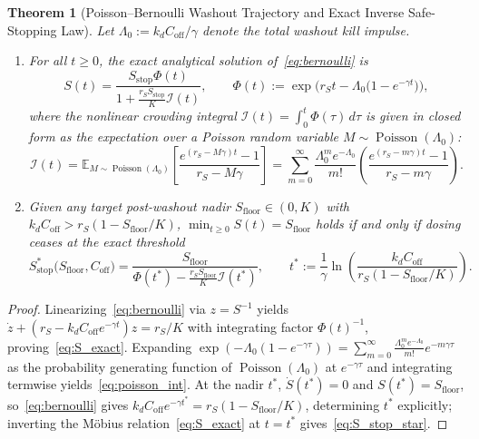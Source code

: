 \documentclass[11pt,reqno]{article}
\newtheorem{theorem}{Theorem}[section]
\begin{document}
\begin{theorem}[Poisson--Bernoulli Washout Trajectory and Exact Inverse Safe-Stopping Law]\label{thm:washout}
Let $\Lambda_0 := k_d C_{\mathrm{off}}/\gamma$ denote the total washout kill impulse.
\begin{enumerate}
    \item For all $t \ge 0$, the exact analytical solution of~\eqref{eq:bernoulli} is
    \begin{equation}\label{eq:S_exact}
    S(t) = \frac{S_{\mathrm{stop}}\Phi(t)}{1 + \frac{r_S S_{\mathrm{stop}}}{K}\mathcal{I}(t)}, \qquad \Phi(t) := \exp\Big(r_S t - \Lambda_0\big(1-e^{-\gamma t}\big)\Big),
    \end{equation}
    where the nonlinear crowding integral $\mathcal{I}(t) = \int_0^t \Phi(\tau)\,d\tau$ is given in closed form as the expectation over a Poisson random variable $M \sim \operatorname{Poisson}(\Lambda_0)$:
    \begin{equation}\label{eq:poisson_int}
    \mathcal{I}(t) = \mathbb{E}_{M\sim\operatorname{Poisson}(\Lambda_0)}\!\left[\frac{e^{(r_S - M\gamma)t}-1}{r_S - M\gamma}\right] = \sum_{m=0}^{\infty} \frac{\Lambda_0^m e^{-\Lambda_0}}{m!}\left(\frac{e^{(r_S - m\gamma)t}-1}{r_S - m\gamma}\right).
    \end{equation}
    \item Given any target post-washout nadir $S_{\mathrm{floor}} \in (0, K)$ with $k_d C_{\mathrm{off}} > r_S(1 - S_{\mathrm{floor}}/K)$, $\min_{t\ge 0} S(t) = S_{\mathrm{floor}}$ holds if and only if dosing ceases at the exact threshold
    \begin{equation}\label{eq:S_stop_star}
    S_{\mathrm{stop}}^*\big(S_{\mathrm{floor}}, C_{\mathrm{off}}\big) = \frac{S_{\mathrm{floor}}}{\Phi(t^*) - \frac{r_S S_{\mathrm{floor}}}{K}\mathcal{I}(t^*)}, \qquad t^* := \frac{1}{\gamma}\ln\!\left(\frac{k_d C_{\mathrm{off}}}{r_S(1 - S_{\mathrm{floor}}/K)}\right).
    \end{equation}
\end{enumerate}
\end{theorem}
\begin{proof}
Linearizing~\eqref{eq:bernoulli} via $z = S^{-1}$ yields $\dot{z} + (r_S - k_d C_{\mathrm{off}}e^{-\gamma t})z = r_S/K$ with integrating factor $\Phi(t)^{-1}$, proving~\eqref{eq:S_exact}. Expanding $\exp(-\Lambda_0(1-e^{-\gamma\tau})) = \sum_{m=0}^\infty \frac{\Lambda_0^m e^{-\Lambda_0}}{m!}e^{-m\gamma\tau}$ as the probability generating function of $\operatorname{Poisson}(\Lambda_0)$ at $e^{-\gamma\tau}$ and integrating termwise yields~\eqref{eq:poisson_int}. At the nadir $t^*$, $\dot{S}(t^*)=0$ and $S(t^*)=S_{\mathrm{floor}}$, so~\eqref{eq:bernoulli} gives $k_d C_{\mathrm{off}}e^{-\gamma t^*} = r_S(1-S_{\mathrm{floor}}/K)$, determining $t^*$ explicitly; inverting the M\"obius relation~\eqref{eq:S_exact} at $t=t^*$ gives~\eqref{eq:S_stop_star}.
\end{proof}
\end{document}
